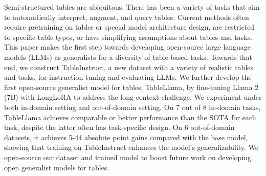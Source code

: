 Semi-structured tables are ubiquitous. There has been a variety of tasks that aim to automatically interpret, augment, and query tables. Current methods often require pretraining on tables or special model architecture design, are restricted to specific table types, or have simplifying assumptions about tables and tasks. This paper makes the first step towards developing open-source large language models (LLMs) as generalists for a diversity of table-based tasks. Towards that end, we construct TableInstruct, a new dataset with a variety of realistic tables and tasks, for instruction tuning and evaluating LLMs. We further develop the first open-source generalist model for tables, TableLlama, by fine-tuning Llama 2 (7B) with LongLoRA to address the long context challenge. We experiment under both in-domain setting and out-of-domain setting. On 7 out of 8 in-domain tasks, TableLlama achieves comparable or better performance than the SOTA for each task, despite the latter often has task-specific design. On 6 out-of-domain datasets, it achieves 5-44 absolute point gains compared with the base model, showing that training on TableInstruct enhances the model's generalizability. We open-source our dataset and trained model to boost future work on developing open generalist models for tables.